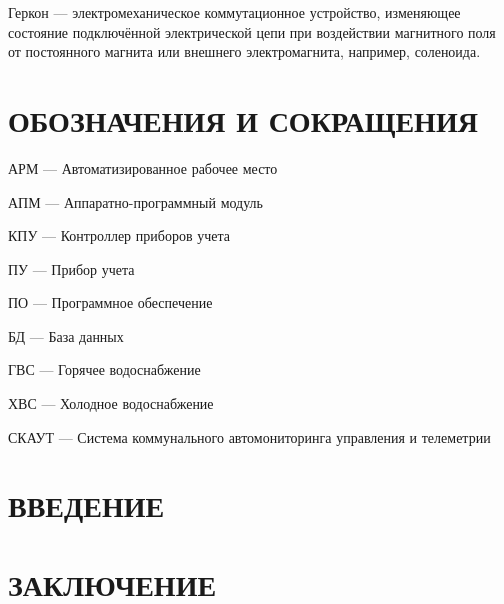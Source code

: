 \documentclass[a4paper,12pt]{article}
\begin{document}
Геркон --- электромеханическое коммутационное устройство, изменяющее состояние подключённой электрической цепи при воздействии магнитного поля от постоянного магнита или внешнего электромагнита, например, соленоида.

\pagebreak

\section*{\centering ОБОЗНАЧЕНИЯ И СОКРАЩЕНИЯ}


АРМ --- Автоматизированное рабочее место

АПМ --- Аппаратно-программный модуль

КПУ --- Контроллер приборов учета

ПУ --- Прибор учета

ПО --- Программное обеспечение

БД --- База данных

ГВС --- Горячее водоснабжение

ХВС --- Холодное водоснабжение

СКАУТ --- Система коммунального автомониторинга управления и телеметрии

\pagebreak



\tableofcontents

\pagebreak

\section*{\centering ВВЕДЕНИЕ}
\pagebreak

%
\pagebreak
\pagebreak
\pagebreak

\pagebreak

\pagebreak

\pagebreak

\section*{\centering ЗАКЛЮЧЕНИЕ}
\end{document}
